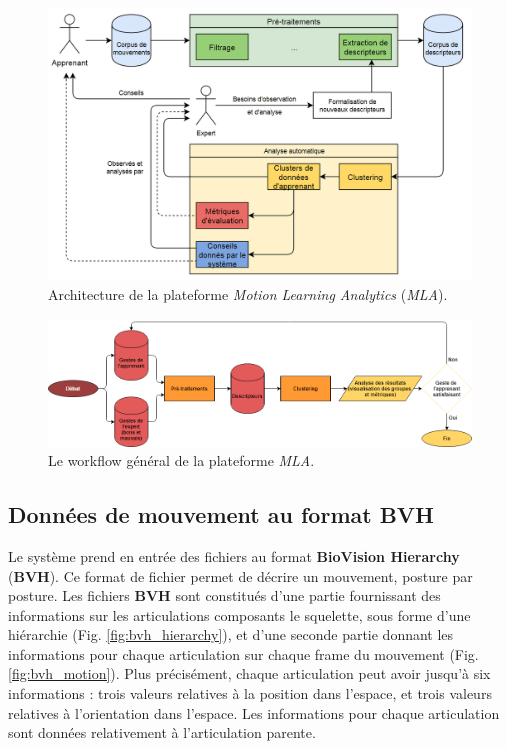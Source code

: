 \begin{figure}[h]
    \centering
    \includegraphics[width=\textwidth]{pictures/MLA_colours.png}
    \caption{Architecture de la plateforme \textit{Motion Learning Analytics} (\textit{MLA}).}
    \label{fig:mla_project}
\end{figure}

\begin{figure}[h]
    \centering
    \includegraphics[width=\textwidth]{pictures/workflow_MLA_2.png}
    \caption{Le workflow général de la plateforme \textit{MLA}.}
    \label{fig:workflow_MLA}
\end{figure}

\subsection{Données de mouvement au format BVH}\label{subsec:bvh}
Le système prend en entrée des fichiers au format \textbf{BioVision Hierarchy} (\textbf{BVH}). Ce format de fichier permet de décrire un mouvement, posture par posture. Les fichiers \textbf{BVH} sont constitués d'une partie fournissant des informations sur les articulations composants le squelette, sous forme d'une hiérarchie (Fig. \ref{fig:bvh_hierarchy}), et d'une seconde partie donnant les informations pour chaque articulation sur chaque frame du mouvement (Fig. \ref{fig:bvh_motion}). Plus précisément, chaque articulation peut avoir jusqu'à six informations : trois valeurs relatives à la position dans l'espace, et trois valeurs relatives à l'orientation dans l'espace. Les informations pour chaque articulation sont données relativement à l'articulation parente.

